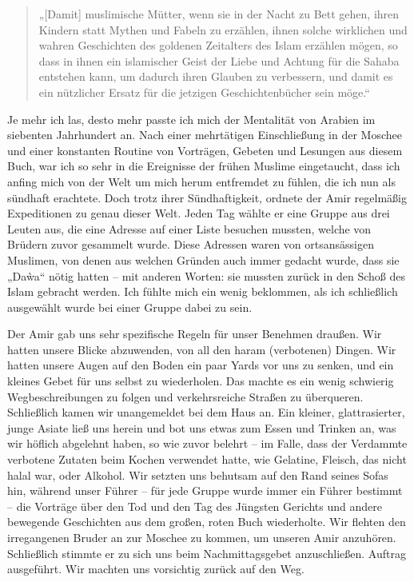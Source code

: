 \documentclass[12pt]{memoir}
\begin{document}
\begin{quote}
„[Damit] muslimische Mütter, wenn sie in der Nacht zu Bett gehen,
ihren Kindern statt Mythen und Fabeln zu erzählen,
ihnen solche wirklichen und wahren Geschichten des goldenen Zeitalters
des Islam erzählen mögen, so dass in ihnen ein islamischer Geist der Liebe
und Achtung für die Sahaba entstehen kann,
um dadurch ihren Glauben zu verbessern,
und damit es ein nützlicher Ersatz
für die jetzigen Geschichtenbücher sein möge.“
\end{quote}

Je mehr ich las, desto mehr passte ich mich der Mentalität
von Arabien im siebenten Jahrhundert an.
Nach einer mehrtätigen Einschließung in der Moschee
und einer konstanten Routine von Vorträgen,
Gebeten und Lesungen aus diesem Buch,
war ich so sehr in die Ereignisse der frühen Muslime eingetaucht,
dass ich anfing mich von der Welt um mich herum entfremdet zu fühlen,
die ich nun als sündhaft erachtete.
Doch trotz ihrer Sündhaftigkeit,
ordnete der Amir regelmäßig Expeditionen zu genau dieser Welt.
Jeden Tag wählte er eine Gruppe aus drei Leuten aus,
die eine Adresse auf einer Liste besuchen mussten,
welche von Brüdern zuvor gesammelt wurde.
Diese Adressen waren von ortsansässigen Muslimen,
von denen aus welchen Gründen auch immer gedacht wurde,
dass sie „Da\`wa“ nötig hatten – mit anderen Worten:
sie mussten zurück in den Schoß des Islam gebracht werden.
Ich fühlte mich ein wenig beklommen,
als ich schließlich ausgewählt wurde bei einer Gruppe dabei zu sein.

Der Amir gab uns sehr spezifische Regeln für unser Benehmen draußen.
Wir hatten unsere Blicke abzuwenden, von all den haram (verbotenen) Dingen.
Wir hatten unsere Augen auf den Boden ein paar Yards vor uns zu senken,
und ein kleines Gebet für uns selbst zu wiederholen.
Das machte es ein wenig schwierig Wegbeschreibungen zu folgen
und verkehrsreiche Straßen zu überqueren.
Schließlich kamen wir unangemeldet bei dem Haus an.
Ein kleiner, glattrasierter, junge Asiate ließ uns herein
und bot uns etwas zum Essen und Trinken an,
was wir höflich abgelehnt haben, so wie zuvor belehrt –
im Falle, dass der Verdammte verbotene Zutaten beim Kochen verwendet hatte,
wie Gelatine, Fleisch, das nicht halal war, oder Alkohol.
Wir setzten uns behutsam auf den Rand seines Sofas hin, während unser Führer –
für jede Gruppe wurde immer ein Führer bestimmt –
die Vorträge über den Tod und den Tag des Jüngsten Gerichts
und andere bewegende Geschichten aus dem großen, roten Buch wiederholte.
Wir flehten den irregangenen Bruder an zur Moschee zu kommen,
um unseren Amir anzuhören.
Schließlich stimmte er zu sich uns beim Nachmittagsgebet anzuschließen.
Auftrag ausgeführt. Wir machten uns vorsichtig zurück auf den Weg.
\end{document}
